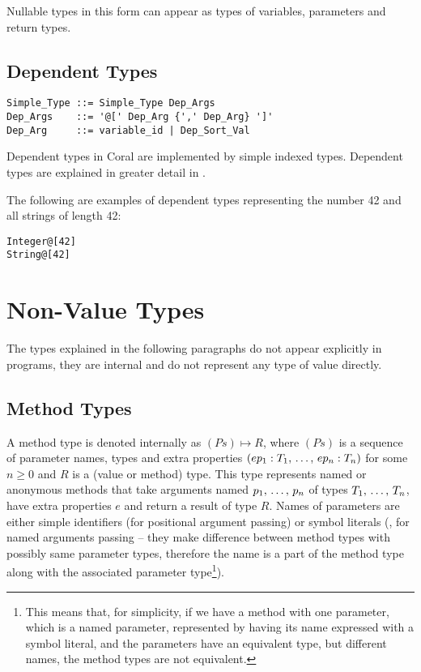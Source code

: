 Nullable types in this form can appear as types of variables, parameters and return types. 






\subsection{Dependent Types}
\label{sec:dependent-types}

\syntax\begin{lstlisting}
Simple_Type ::= Simple_Type Dep_Args
Dep_Args    ::= '@[' Dep_Arg {',' Dep_Arg} ']'
Dep_Arg     ::= variable_id | Dep_Sort_Val
\end{lstlisting}

Dependent types in Coral are implemented by simple indexed types. Dependent types are explained in greater detail in . 

\example The following are examples of dependent types representing the number 42 and all strings of length 42:
\begin{lstlisting}
Integer@[42]
String@[42]
\end{lstlisting}






\section{Non-Value Types}

The types explained in the following paragraphs do not appear explicitly in programs, they are internal and do not represent any type of value directly. 






\subsection{Method Types}
\label{sec:method-types}

A method type is denoted internally as $(Ps) \mapsto R$, where $(Ps)$ is a sequence of parameter names, types and extra properties $(ep_1 : T_1 ,\, \ldots ,\, ep_n : T_n)$ for some $n \geq 0$ and $R$ is a (value or method) type. This type represents named or anonymous methods that take arguments named $p_1 ,\, \ldots ,\, p_n$ of types $T_1 ,\, \ldots ,\, T_n$, have extra properties $e$ and return a result of type $R$. Names of parameters are either simple identifiers (for positional argument passing) or symbol literals (, for named arguments passing -- they make difference between method types with possibly same parameter types, therefore the name is a part of the method type along with the associated parameter type\footnote{This means that, for simplicity, if we have a method with one parameter, which is a named parameter, represented by having its name expressed with a symbol literal, and the parameters have an equivalent type, but different names, the method types are not equivalent.}). 

